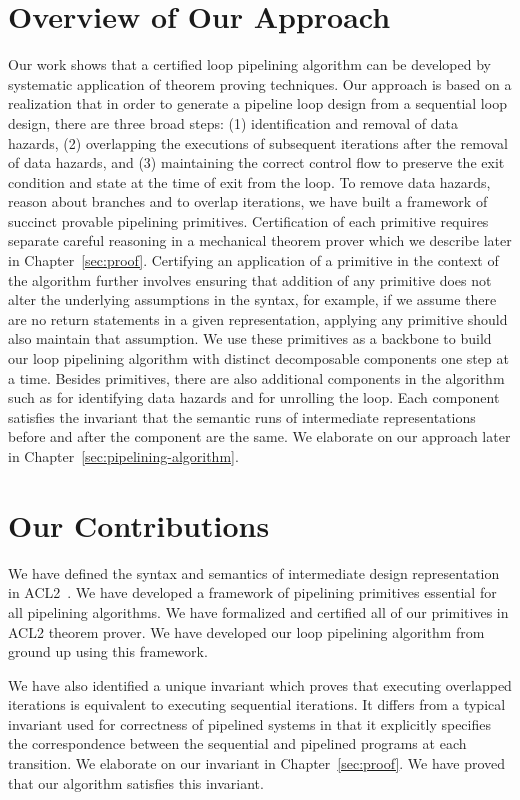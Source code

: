 \section {Overview of Our Approach}
Our work shows that a certified loop pipelining algorithm can be developed by systematic application of theorem proving techniques. Our approach is based on a realization that in order to generate a pipeline loop design from a sequential loop design, there are three broad steps: (1) identification and removal of data hazards, (2) overlapping the executions of subsequent iterations after the removal of data hazards, and (3) maintaining the correct control flow to preserve the exit condition and state at the time of exit from the loop. 
To remove data hazards, reason about branches and to overlap iterations, we have built a framework of succinct provable pipelining primitives.
Certification of each primitive requires separate careful reasoning in a mechanical theorem prover which we describe later in Chapter~\ref{sec:proof}. Certifying an application of a primitive in the context of the algorithm further involves ensuring that addition of any primitive does not alter the underlying assumptions in the syntax, for example, if we assume there are no return statements in a given representation, applying any primitive should also maintain that assumption. We use these primitives as a backbone to build our loop pipelining algorithm with distinct decomposable components one step at a time. Besides primitives, there are also additional components in the algorithm such as for identifying data hazards and for unrolling the loop.
Each component satisfies the invariant that the semantic runs of intermediate representations before and after the component are the same.  We elaborate on our approach later in Chapter~\ref{sec:pipelining-algorithm}.

\section{Our Contributions}
We have defined the syntax and semantics of intermediate design representation in ACL2~\cite{disha-acl214}. We have developed a framework of pipelining primitives essential for all pipelining algorithms. We have formalized and certified all of our primitives in ACL2 theorem prover. We have developed our loop pipelining algorithm from ground up using this framework.

We have also identified a unique invariant which proves that executing overlapped iterations is equivalent to executing sequential iterations. It differs from a typical invariant used for correctness of pipelined
systems in that it explicitly specifies the correspondence between the
sequential and pipelined programs at each transition.  We elaborate on our invariant in Chapter~\ref{sec:proof}. 
We have proved that our algorithm satisfies this invariant.

